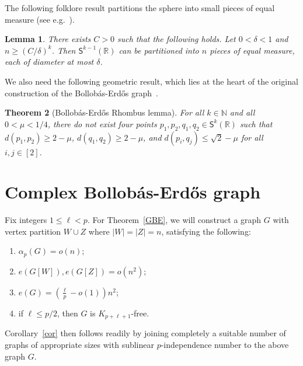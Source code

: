 \documentclass[10pt,a4paper]{article}
\newcounter{propcounter}
\newtheorem{theorem}{Theorem}[section]
\newtheorem{lemma}[theorem]{Lemma}
\theoremstyle{definition}
\def\al{{\alpha}}
\newcommand{\sS}{\mathsf{S}}
\newcommand{\sR}{\mathbb{R}}
\begin{document}
The following folklore result partitions the sphere into small pieces of equal measure (see e.g.~\cite{FS}).
\begin{lemma}\label{lem: partition-sphere}
	There exists $C>0$ such that the following holds. Let $0<\delta<1$ and $n\ge (C/\delta)^k$. Then $\sS^{k-1}(\sR)$ can be partitioned into $n$ pieces of equal measure, each of diameter at most $\delta$.
\end{lemma}

We also need the following geometric result, which lies at the heart of the original construction of the Bollob\'as-Erd\H os graph~\cite{BolErd76}.
\begin{theorem}[Bollob\'as-Erd\H os Rhombus lemma]\label{thm-k4}
	For all $k \in \mathbb{N}$ and all $0<\mu<1/4$, there do not exist four points $p_1,p_2,q_1,q_2\in\sS^k(\sR)$ such that $d(p_1,p_2)\ge 2-\mu$, $d(q_1,q_2)\ge 2-\mu$, and $d(p_i,q_j)\le\sqrt{2}-\mu$ for all $i,j\in [2]$.
\end{theorem}





\section{Complex Bollob\'as-Erd\H os graph}\label{sec-GBE}
Fix integers $1\le \ell <p$. For Theorem~\ref{GBE}, we will construct a graph $G$ with vertex partition $W \cup Z$ where $|W|=|Z|=n$, satisfying the following:
\begin{enumerate}[label = {\bfseries \Alph{propcounter}\arabic{enumi}}]
	\item\label{CBE:p-ind} $\al_{p}(G)= o(n)$;
	\item\label{CBE:sparse-inside} $e(G[W]),e(G[Z]) = o(n^2)$;
    \item\label{CBE:density} $e(G)= \left(\frac{\ell}{p}-o(1)\right)n^2$;
    \item\label{CBE:clique} if $\ell\le p/2$, then $G$ is $K_{p+\ell+1}$-free.
\end{enumerate}
Corollary~\ref{cor} then follows readily by joining completely a suitable number of graphs of appropriate sizes with sublinear $p$-independence number to the above graph $G$.
\end{document}
